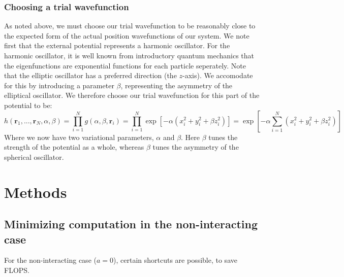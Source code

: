 \documentclass[a4paper, 10pt]{article}
\begin{document}
\subsubsection{Choosing a trial wavefunction}
As noted above, we must choose our trial wavefunction to be reasonably close to the expected form of the actual position wavefunctions of our system. We note first that the external potential represents a harmonic oscillator. For the harmonic oscillator, it is well known from introductory quantum mechanics that the eigenfunctions are exponential functions for each particle seperately. Note that the elliptic oscillator has a preferred direction (the $z$-axis). We accomodate for this by introducing a parameter $\beta$, representing the asymmetry of the elliptical oscillator. We therefore choose our trial wavefunction for this part of the potential to be:
\begin{equation}
h(\boldsymbol{r}_1, ..., \boldsymbol{r}_N, \alpha, \beta)=\prod_{i=1}^N g(\alpha,\beta, \boldsymbol{r}_i)=\prod_{i=1}^N \exp[-\alpha(x_i^2+y_i^2+\beta z_i^2)]=\exp[-\alpha \sum_{i=1}^N (x_i^2+y_i^2+\beta z_i^2)]
\end{equation}
Where we now have two variational parameters, $\alpha$ and $\beta$. Here $\beta$ tunes the strength of the potential as a whole, whereas $\beta$ tunes the asymmetry of the spherical oscillator.









\section{Methods}\label{Method_section}
\subsection{Minimizing computation in the non-interacting case}
For the non-interacting case ($a=0$), certain shortcuts are possible, to save FLOPS. 
\end{document}
